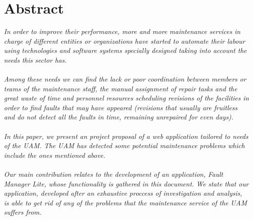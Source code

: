 \section{Abstract}

\textit{
In order to improve their performance, more and more maintenance services in charge of different entities or organizations have started to automate their labour using technologies and software systems specially designed taking into account the needs this sector has.\\\\
Among these needs we can find the lack or poor coordination between members or teams of the maintenance staff, the manual assignment of repair tasks and the great waste of time and personnel resources scheduling revisions of the facilities in order to find faults that may have appeared (revisions that usually are fruitless and do not detect all the faults in time, remaining unrepaired for even days).\\\\
In this paper, we present an project proposal of a web application tailored to needs of the UAM. The UAM has detected some potential maintenance problems which include the ones mentioned above.\\\\
Our main contribution relates to the development of an application, Fault Manager Lite, whose functionality is gathered in this document. We state that our application, developed after an exhaustive proccess of investigation and analysis, is able to get rid of any of the problems that the maintenance service of the UAM suffers from.\\\\
}